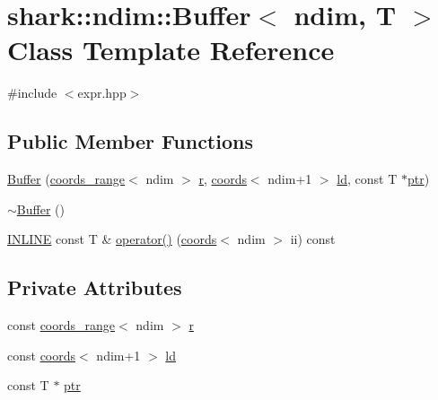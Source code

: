 \hypertarget{classshark_1_1ndim_1_1_buffer}{}\section{shark\+:\+:ndim\+:\+:Buffer$<$ ndim, T $>$ Class Template Reference}
\label{classshark_1_1ndim_1_1_buffer}


{\ttfamily \#include $<$expr.\+hpp$>$}

\subsection*{Public Member Functions}
\begin{DoxyCompactItemize}
\item 
\hyperlink{classshark_1_1ndim_1_1_buffer_a835dbc113d95b290cd274d9895280e1f}{Buffer} (\hyperlink{structshark_1_1ndim_1_1coords__range}{coords\+\_\+range}$<$ ndim $>$ \hyperlink{classshark_1_1ndim_1_1_buffer_adf5e1304ce98553284cf98e88e6c24e0}{r}, \hyperlink{structshark_1_1ndim_1_1coords}{coords}$<$ ndim+1 $>$ \hyperlink{classshark_1_1ndim_1_1_buffer_aa17fcbd807223fcb3cc5f211c32253d1}{ld}, const T $\ast$\hyperlink{classshark_1_1ndim_1_1_buffer_a0a63bf45d2f93a9670d736ae5123331a}{ptr})
\item 
\hyperlink{classshark_1_1ndim_1_1_buffer_a59b8743e4a5f731bdd0c4185c9ef263b}{$\sim$\+Buffer} ()
\item 
\hyperlink{common_8hpp_a2eb6f9e0395b47b8d5e3eeae4fe0c116}{I\+N\+L\+I\+NE} const T \& \hyperlink{classshark_1_1ndim_1_1_buffer_ad2395794d4c56e71376178d770061a09}{operator()} (\hyperlink{structshark_1_1ndim_1_1coords}{coords}$<$ ndim $>$ ii) const
\end{DoxyCompactItemize}
\subsection*{Private Attributes}
\begin{DoxyCompactItemize}
\item 
const \hyperlink{structshark_1_1ndim_1_1coords__range}{coords\+\_\+range}$<$ ndim $>$ \hyperlink{classshark_1_1ndim_1_1_buffer_adf5e1304ce98553284cf98e88e6c24e0}{r}
\item 
const \hyperlink{structshark_1_1ndim_1_1coords}{coords}$<$ ndim+1 $>$ \hyperlink{classshark_1_1ndim_1_1_buffer_aa17fcbd807223fcb3cc5f211c32253d1}{ld}
\item 
const T $\ast$ \hyperlink{classshark_1_1ndim_1_1_buffer_a0a63bf45d2f93a9670d736ae5123331a}{ptr}
\end{DoxyCompactItemize}


